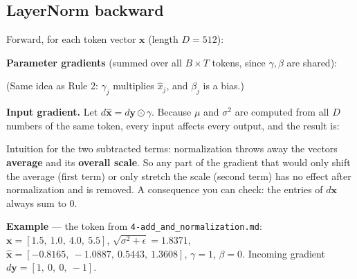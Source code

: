 \documentclass[11pt,a4paper,oneside]{report}
\begin{document}
\subsection{LayerNorm backward}\label{layernorm-backward}

Forward, for each token vector \(\mathbf{x}\) (length \(D = 512\)):

\begin{center}\end{center}

\textbf{Parameter gradients} (summed over all \(B \times T\) tokens, since \(\gamma, \beta\) are shared):

\begin{center}\end{center}

(Same idea as Rule 2: \(\gamma_j\) multiplies \(\hat{x}_j\), and \(\beta_j\) is a bias.)

\textbf{Input gradient.} Let \(d\hat{\mathbf{x}} = d\mathbf{y} \odot \gamma\). Because \(\mu\) and \(\sigma^2\) are computed from all \(D\) numbers of the same token, every input affects every output, and the result is:

\begin{center}\end{center}

Intuition for the two subtracted terms: normalization throws away the vector\textquotesingle s \textbf{average} and its \textbf{overall scale}. So any part of the gradient that would only shift the average (first term) or only stretch the scale (second term) has no effect after normalization and is removed. A consequence you can check: the entries of \(d\mathbf{x}\) always sum to \(0\).

\textbf{Example} --- the token from \texttt{4-add\_\allowbreak{}and\_\allowbreak{}normalization.\allowbreak{}md}: \(\mathbf{x} = [1.5,\ 1.0,\ 4.0,\ 5.5]\), \(\sqrt{\sigma^2 + \epsilon} = 1.8371\), \(\hat{\mathbf{x}} = [-0.8165,\ -1.0887,\ 0.5443,\ 1.3608]\), \(\gamma = 1\), \(\beta = 0\). Incoming gradient \(d\mathbf{y} = [1,\ 0,\ 0,\ -1]\).
\end{document}
